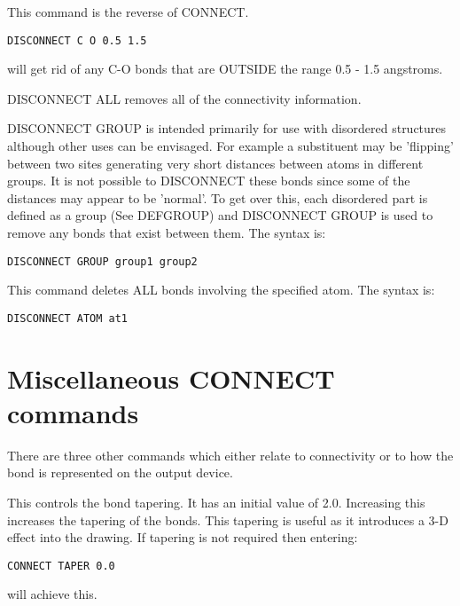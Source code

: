 \documentclass[10pt,a4paper]{report}
\begin{document}
This command is the reverse of CONNECT.
\small\begin{verbatim}
DISCONNECT C O 0.5 1.5
\end{verbatim}\normalsize


will get rid of any C-O bonds that are OUTSIDE the range 0.5 - 1.5
angstroms.


\bigskip{}
DISCONNECT ALL removes all of the connectivity information.


\bigskip{}
DISCONNECT GROUP is intended primarily for use with disordered
structures although other uses can be envisaged. For example a
substituent
may be 'flipping' between two sites generating very short
distances between
atoms in different groups. It is not possible to DISCONNECT these
bonds
since some of the distances may appear to be 'normal'. To get
over this,
each disordered part is defined as a group (See DEFGROUP) and
DISCONNECT
GROUP is used to remove any bonds that exist between them. The
syntax is:
\small\begin{verbatim}
DISCONNECT GROUP group1 group2
\end{verbatim}\normalsize




\bigskip{}


This command deletes ALL bonds involving the specified atom. The 
syntax is:
\small\begin{verbatim}
DISCONNECT ATOM at1 
\end{verbatim}\normalsize


\section{Miscellaneous CONNECT commands}


There are three other commands which either relate to
connectivity or
to how the bond is represented on the output device.


\bigskip{}


This controls the bond tapering. It has an initial value of 2.0. Increasing this increases the tapering of the bonds. This
tapering is
useful as it introduces a 3-D effect into the drawing. If
tapering is
not required then entering:
\small\begin{verbatim}
CONNECT TAPER 0.0
\end{verbatim}\normalsize


will achieve this.


\bigskip{}
\end{document}
